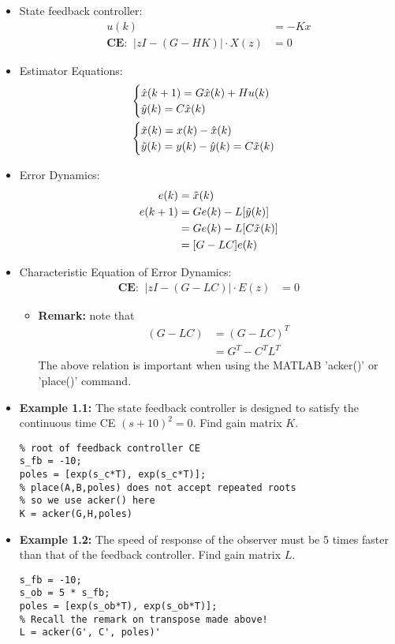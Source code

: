\begin{itemize}
    \item State feedback controller:
    \begin{align*}
        u(k)&=-Kx \\
        \textbf{CE:} \; \; \left|zI-(G-HK)\right|\cdot X(z)&=0
    \end{align*}
    \item Estimator Equations:
    \begin{align*}  
        &\begin{cases}
            \hat{x}(k+1) = G \hat{x}(k)+H u(k) \\
            \hat{y}(k) = C \hat{x}(k)
        \end{cases} \\
        &\begin{cases}
            \Tilde{x}(k) = x(k) - \hat{x}(k) \\
            \Tilde{y}(k) = y(k) - \hat{y}(k) = C \Tilde{x}(k)
        \end{cases}
    \end{align*}
    \item Error Dynamics:
    \begin{align*}
        e(k) &= \Tilde{x}(k) \\
        e(k+1) &= G e(k) - L[ \Tilde{y}(k)] \\
        &= Ge(k)-L[C\Tilde{x}(k)] \\
        &= [G-LC]e(k) 
    \end{align*}
    \item Characteristic Equation of Error Dynamics:
    \begin{align*}
        \textbf{CE:}\;\; \left|zI-(G-LC)\right|\cdot E(z)&=0
    \end{align*}
    \begin{itemize}
        \item \textbf{Remark:} note that
        \begin{align*}
            (G-LC) &= (G-LC)^{T} \\
            &= G^T - C^T L^T
        \end{align*}
        The above relation is important when using the MATLAB 'acker()' or 'place()' command.
    \end{itemize}
    \item \textbf{Example 1.1:} The state feedback controller is designed to satisfy the continuous time CE $(s+10)^2=0$. Find gain matrix $K$.
\begin{lstlisting}
% root of feedback controller CE
s_fb = -10;
poles = [exp(s_c*T), exp(s_c*T)];
% place(A,B,poles) does not accept repeated roots
% so we use acker() here
K = acker(G,H,poles)
\end{lstlisting}
    \item \textbf{Example 1.2:} The speed of response of the observer must be 5 times faster than that of the feedback controller. Find gain matrix $L$.
\begin{lstlisting}
s_fb = -10;
s_ob = 5 * s_fb;
poles = [exp(s_ob*T), exp(s_ob*T)];
% Recall the remark on transpose made above!
L = acker(G', C', poles)'
\end{lstlisting}
\end{itemize}


